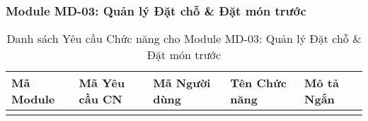 \subsubsection{Module MD-03: Quản lý Đặt chỗ \& Đặt món trước}

\begin{longtable}{|m{2cm}|m{2.5cm}|m{2cm}|m{4.5cm}|m{4cm}|}
\caption{Danh sách Yêu cầu Chức năng cho Module MD-03: Quản lý Đặt chỗ \& Đặt món trước} \label{tab:fr_md03} \\
\hline
\textbf{Mã Module} & \textbf{Mã Yêu cầu CN} & \textbf{Mã Người dùng} & \textbf{Tên Chức năng} & \textbf{Mô tả Ngắn} \\
\hline
\endhead %

\hline
\endfoot %

\hline
\endlastfoot %


\end{longtable}
